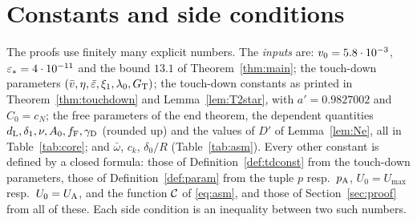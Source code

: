 \section{Constants and side conditions}\label{app:const}

The proofs use finitely many explicit numbers. The \emph{inputs} are: $v_0=5.8\cdot10^{-3}$, $\varepsilon_*=4\cdot10^{-11}$ and the bound
$13.1$ of Theorem~\ref{thm:main}; the touch-down parameters $(\bar v,\eta,\bar\varepsilon,\xi_1,\lambda_0,G_{\mathrm T})$; the touch-down constants
as printed in Theorem~\ref{thm:touchdown} and Lemma~\ref{lem:T2star}, with $a'=0.9827002$ and $C_0=c_N$; the free parameters of the end
theorem, the dependent quantities $d_{\mathrm L},\delta_1,\nu,A_0,f_{\mathrm F},\gamma_{\mathrm D}$ (rounded up) and the values of $D'$ of Lemma~\ref{lem:Ne}, all in
Table~\ref{tab:core}; and $\bar\omega$, $c_k$, $\delta_0/R$ (Table~\ref{tab:asm}). Every other constant is defined by a closed formula: those
of Definition~\ref{def:tdconst} from the touch-down parameters, those of Definition~\ref{def:param} from the tuple $p$ resp.\ $p_{\mathrm A}$,
$U_0=U_{\max}$ resp.\ $U_0=U_{\mathrm A}$, and the function $\mathcal C$ of \eqref{eq:asm}, and those of Section~\ref{sec:proof} from all of these. Each
side condition is an inequality between two such numbers.

